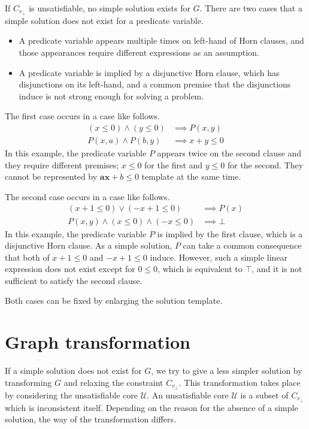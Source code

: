 \documentclass[master,final,12pt]{iscs-thesis}
\begin{document}
If $C_{v_\bot}$ is unsatisfiable, no simple solution exists for $G$.
There are two cases that a simple solution does not exist for a
predicate variable.
\begin{itemize}
\item A predicate variable appears multiple times on left-hand of Horn
  clauses, and those appearances require different expressions as an
  assumption.
\item A predicate variable is implied by a disjunctive Horn clause,
  which has disjunctions on its left-hand, and a common premise that
  the disjunctions induce is not strong enough for solving a problem.
\end{itemize}

The first case occurs in a case like follows.
\begin{align*}
\left( x \leq 0 \right) \wedge \left( y \leq 0 \right) & \implies P(x,y) \\
P(x,a) \wedge P(b,y) & \implies x+y \leq 0
\end{align*}
In this example, the predicate variable $P$ appears twice on the
second clause and they require different premises; $x \leq 0$ for the
first and $y \leq 0$ for the second.  They cannot be represented by
$\mathbf{ax} + b \leq 0$ template at the same time.

The second case occurs in a case like follows.
\begin{align*}
\left( x+1 \leq 0 \right) \vee \left( -x+1 \leq 0 \right) & \implies P(x) \\
P(x,y) \wedge \left( x \leq 0 \right) \wedge \left( -x \leq 0 \right) & \implies \bot
\end{align*}
In this example, the predicate variable $P$ is implied by the first
clause, which is a disjunctive Horn clause.  As a simple solution, $P$
can take a common consequence that both of $x+1 \leq 0$ and $-x+1 \leq
0$ induce.  However, such a simple linear expression does not exist
except for $0 \leq 0$, which is equivalent to $\top$, and it is not
sufficient to satisfy the second clause.

Both cases can be fixed by enlarging the solution template.


\section {Graph transformation}

If a simple solution does not exist for $G$, we try to give a less
simpler solution by transforming $G$ and relaxing the constraint
$C_{v_\bot}$.  This transformation takes place by considering the
unsatisfiable core $\mathcal{U}$.  An unsatisfiable core $\mathcal{U}$
is a subset of $C_{v_\bot}$ which is inconsistent itself.  Depending
on the reason for the absence of a simple solution, the way of the
transformation differs.
\end{document}
